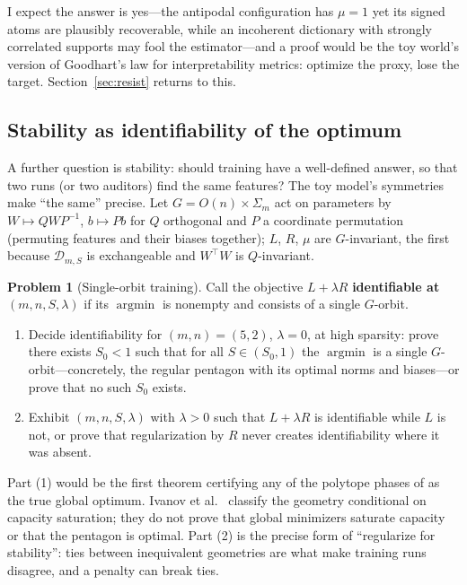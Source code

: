 \documentclass[11pt]{amsart}
\theoremstyle{plain}
\theoremstyle{definition}
\newtheorem{problem}[theorem]{Problem}
\begin{document}
I expect the answer is yes---the antipodal configuration has $\mu=1$ yet its signed atoms are plausibly recoverable, while an incoherent dictionary with strongly correlated supports may fool the estimator---and a proof would be the toy world's version of Goodhart's law for interpretability metrics: optimize the proxy, lose the target. Section~\ref{sec:resist} returns to this.

\subsection{Stability as identifiability of the optimum}

A further question is stability: should training have a well-defined answer, so that two runs (or two auditors) find the same features? The toy model's symmetries make ``the same'' precise. Let $G = O(n)\times \Sigma_m$ act on parameters by $W\mapsto QW P^{-1}$, $b \mapsto Pb$ for $Q$ orthogonal and $P$ a coordinate permutation (permuting features and their biases together); $L$, $R$, $\mu$ are $G$-invariant, the first because $\mathcal D_{m,S}$ is exchangeable and $W^\top W$ is $Q$-invariant.

\begin{problem}[Single-orbit training]\label{prob:orbit}
Call the objective $L+\lambda R$ \textbf{identifiable at} $(m,n,S,\lambda)$ if its $\operatorname{argmin}$ is nonempty and consists of a single $G$-orbit.
\begin{enumerate}
\item Decide identifiability for $(m,n)=(5,2)$, $\lambda=0$, at high sparsity: prove there exists $S_0<1$ such that for all $S\in(S_0,1)$ the $\operatorname{argmin}$ is a single $G$-orbit---concretely, the regular pentagon with its optimal norms and biases---or prove that no such $S_0$ exists.
\item Exhibit $(m,n,S,\lambda)$ with $\lambda>0$ such that $L+\lambda R$ is identifiable while $L$ is not, or prove that regularization by $R$ never creates identifiability where it was absent.
\end{enumerate}
\end{problem}

Part (1) would be the first theorem certifying any of the polytope phases of \cite{elhage2022} as the true global optimum. Ivanov et al.~\cite{ivanov2026} classify the geometry conditional on capacity saturation; they do not prove that global minimizers saturate capacity or that the pentagon is optimal. Part (2) is the precise form of ``regularize for stability'': ties between inequivalent geometries are what make training runs disagree, and a penalty can break ties.
\end{document}
